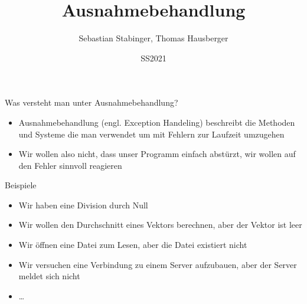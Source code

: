 \documentclass[presentation]{beamer}
\author{Sebastian Stabinger, Thomas Hausberger}
\date{SS2021}
\title{Ausnahmebehandlung}
\begin{document}
\maketitle

\begin{frame}[label={sec:orgea49bed}]{Was versteht man unter Ausnahmebehandlung?}
\begin{itemize}
\item Ausnahmebehandlung (engl. Exception Handeling) beschreibt die
Methoden und Systeme die man verwendet um mit Fehlern \alert{zur Laufzeit}
umzugehen
\item Wir wollen also nicht, dass unser Programm einfach abstürzt, wir
\alert{wollen auf den Fehler sinnvoll reagieren}
\end{itemize}
\begin{block}{Beispiele}
\begin{itemize}
\item Wir haben eine Division durch Null
\item Wir wollen den Durchschnitt eines Vektors berechnen, aber der Vektor
ist leer
\item Wir öffnen eine Datei zum Lesen, aber die Datei existiert nicht
\item Wir versuchen eine Verbindung zu einem Server aufzubauen, aber der
Server meldet sich nicht
\item \ldots{}
\end{itemize}
\end{block}
\end{frame}
\end{document}
